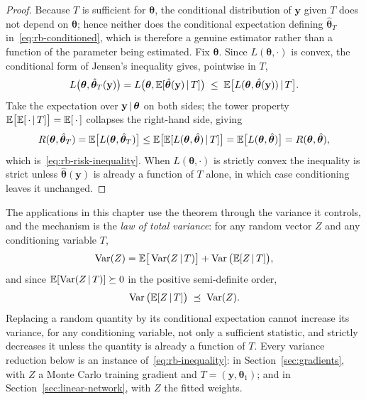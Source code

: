 \begin{proof}
Because $T$ is sufficient for $\bm{\theta}$, the conditional
distribution of $\mathbf{y}$ given $T$ does not depend on
$\bm{\theta}$; hence neither does the conditional expectation
defining $\hat{\bm{\theta}}_T$ in~\eqref{eq:rb-conditioned}, which is
therefore a genuine estimator rather than a function of the parameter
being estimated. Fix $\bm{\theta}$. Since $L(\bm{\theta}, \cdot)$ is
convex, the conditional form of Jensen's inequality gives, pointwise
in $T$,
%
\begin{equation}
  L\big(\bm{\theta}, \hat{\bm{\theta}}_T(\mathbf{y})\big)
  = L\big(\bm{\theta}, \mathbb{E}[\hat{\bm{\theta}}(\mathbf{y}) \,|\, T]\big)
  \;\le\;
  \mathbb{E}\big[L(\bm{\theta}, \hat{\bm{\theta}}(\mathbf{y})) \,|\, T\big].
\end{equation}
%
Take the expectation over $\mathbf{y} \,|\, \bm{\theta}$ on both
sides; the tower property
$\mathbb{E}\big[\mathbb{E}[\,\cdot \,|\, T]\big] = \mathbb{E}[\,\cdot\,]$ collapses the
right-hand side, giving
%
\begin{equation}
  R(\bm{\theta}, \hat{\bm{\theta}}_T)
  = \mathbb{E}\big[L(\bm{\theta}, \hat{\bm{\theta}}_T)\big]
  \le \mathbb{E}\big[\mathbb{E}[L(\bm{\theta}, \hat{\bm{\theta}}) \,|\, T]\big]
  = \mathbb{E}\big[L(\bm{\theta}, \hat{\bm{\theta}})\big]
  = R(\bm{\theta}, \hat{\bm{\theta}}),
\end{equation}
%
which is~\eqref{eq:rb-risk-inequality}. When $L(\bm{\theta}, \cdot)$
is strictly convex the inequality is strict unless
$\hat{\bm{\theta}}(\mathbf{y})$ is already a function of $T$ alone, in
which case conditioning leaves it unchanged.
\end{proof}

The applications in this chapter use the theorem through the variance
it controls, and the mechanism is the \emph{law of total variance}: for
any random vector $Z$ and any conditioning variable $T$,
%
\begin{equation}
  \operatorname{Var}(Z)
  = \mathbb{E}\big[\operatorname{Var}(Z \,|\, T)\big]
  + \operatorname{Var}\big(\mathbb{E}[Z \,|\, T]\big),
  \label{eq:total-variance}
\end{equation}
%
and since $\mathbb{E}[\operatorname{Var}(Z \,|\, T)] \succeq 0$ in the positive
semi-definite order,
%
\begin{equation}
  \operatorname{Var}\big(\mathbb{E}[Z \,|\, T]\big) \;\preceq\; \operatorname{Var}(Z).
  \label{eq:rb-inequality}
\end{equation}
%
Replacing a random quantity by its conditional expectation cannot
increase its variance, for any conditioning variable, not
only a sufficient statistic, and strictly decreases it unless the
quantity is already a function of $T$. Every variance reduction below
is an instance of~\eqref{eq:rb-inequality}: in
Section~\ref{sec:gradients}, with $Z$ a Monte Carlo training gradient
and $T = (\mathbf{y}, \bm{\theta}_1)$; and in
Section~\ref{sec:linear-network}, with $Z$ the fitted weights.


